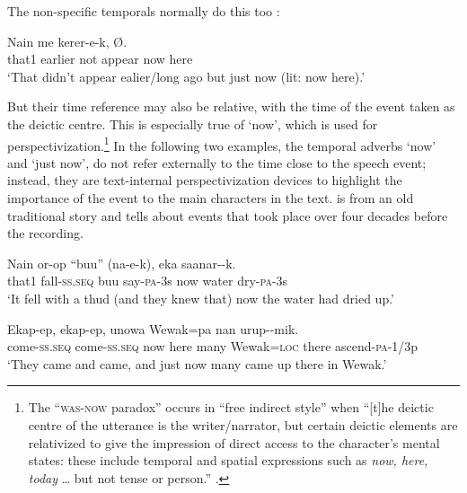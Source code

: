 The non-specific temporals normally do this too : 

\ea%
\label{ex:6:x1890}
\gll Nain    me  kerer-e-k,     {\O}. \\
that1  earlier  not  appear  now  here \\
\glt `That didn't appear ealier/long ago but just now (lit: now here).'
\z

But their time reference may also be relative, with the time of the event taken as the deictic centre. This is especially true of  `now', which is used for perspectivization.\footnote{The ``\textsc{was-now} paradox'' occurs in ``free indirect style'' when ``[t]he deictic centre of the utterance is the writer/narrator, but certain deictic elements are relativized to give the impression of direct access to the character's mental states: these include temporal and spatial expressions such as \textit{now, here, today} {\dots} but not tense or person.'' \citep{MushinEtAl2000}.} In the following two examples, the temporal adverbs  `now' and  `just now', do not refer externally to the time close to the speech event; instead, they are text-internal perspectivization devices to highlight the importance of the event to the main characters in the text.  is from an old traditional story and  tells about events that took place over four decades before the recording. 

\ea%
\label{ex:6:x475}
\gll Nain  or-op  ``buu''  (na-e-k),    eka  saanar--k. \\
that1  fall-\textsc{ss}.\textsc{seq}  buu  say-\textsc{pa}-3s  now  water  dry-\textsc{pa}-3s\\
\glt `It fell with a thud (and they knew that) now the water had dried up.'
\z

\ea%
\label{ex:6:x1891}
\gll Ekap-ep,  ekap-ep,     unowa  Wewak=pa nan  urup--mik.\\
come-\textsc{ss}.\textsc{seq}  come-\textsc{ss}.\textsc{seq}  now  here  many  Wewak=\textsc{loc} there  ascend-\textsc{pa}-1/3p \\
\glt `They came and came, and just now many came up there in Wewak.'
\z

